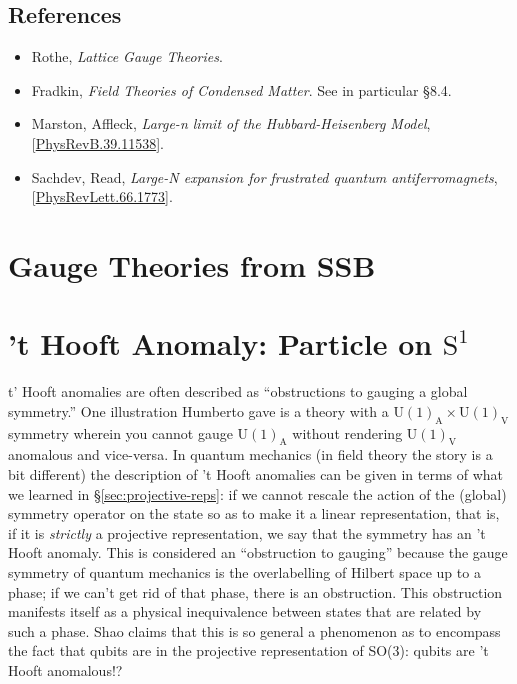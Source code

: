 \documentclass{report}
\begin{document}
\subsection*{References}
\begin{itemize}[nosep]
\item Rothe, \textit{Lattice Gauge Theories}. 
\item Fradkin, \textit{Field Theories of Condensed Matter}. See in particular 
	\S 8.4.
\item Marston, Affleck, \textit{Large-n limit of the Hubbard-Heisenberg Model}, 
	[\href{https://journals.aps.org/prb/abstract/10.1103/PhysRevB.39.11538}{PhysRevB.39.11538}].
\item Sachdev, Read, \textit{Large-N expansion for frustrated quantum antiferromagnets},
	[\href{https://journals.aps.org/prl/abstract/10.1103/PhysRevLett.66.1773}{PhysRevLett.66.1773}].
\end{itemize}

\section{Gauge Theories from SSB}

\section{'t Hooft Anomaly: Particle on $\text{S}^\text{1}$}\label{sec:particle-on-ring}
t' Hooft anomalies are often described as ``obstructions to gauging a global
symmetry.'' One illustration Humberto gave is a theory with a $
\text{U}(1)_\text{A} \times \text{U}(1)_{\text{V}} $ symmetry wherein you cannot
gauge $ \text{U}(1)_{\text{A}} $ without rendering $ \text{U}(1)_{\text{V}} $
anomalous and vice-versa. In quantum mechanics (in field theory the story is a 
bit different) the description of 't Hooft anomalies can be given in terms of 
what we learned in \S \ref{sec:projective-reps}: if we cannot rescale the 
action of the (global) symmetry operator on the state so as to make it a linear representation, 
that is, if it is \textit{strictly} a projective representation, we say that 
the symmetry has an 't Hooft anomaly. This is considered an ``obstruction to 
gauging'' because the gauge symmetry of quantum mechanics is the overlabelling 
of Hilbert space up to a phase; if we can't get rid of that phase, there is 
an obstruction. This obstruction manifests itself as a physical inequivalence 
between states that are related by such a phase. Shao claims that this is 
so general a phenomenon as to encompass the fact that qubits are in the 
projective representation of SO(3): qubits are 't Hooft anomalous!?
\end{document}
